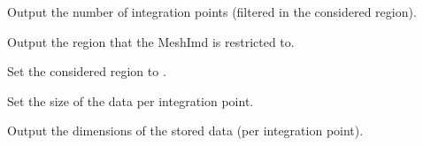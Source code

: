 \documentclass[a4paper,11pt,english]{sphinxmanual}
\begin{document}
\begin{fulllineitems}
\begin{fulllineitems}
\end{fulllineitems}


\begin{fulllineitems}
\label{\detokenize{python/cmdref_MeshImData:getfem.MeshImData.nbpts}}
Output the number of integration points (filtered in the considered region).

\end{fulllineitems}


\begin{fulllineitems}
\label{\detokenize{python/cmdref_MeshImData:getfem.MeshImData.region}}
Output the region that the MeshImd is restricted to.

\end{fulllineitems}


\begin{fulllineitems}
\label{\detokenize{python/cmdref_MeshImData:getfem.MeshImData.set_region}}
Set the considered region to .

\end{fulllineitems}


\begin{fulllineitems}
\label{\detokenize{python/cmdref_MeshImData:getfem.MeshImData.set_tensor_size}}
Set the size of the data per integration point.

\end{fulllineitems}


\begin{fulllineitems}
\label{\detokenize{python/cmdref_MeshImData:getfem.MeshImData.tensor_size}}
Output the dimensions of the stored data (per integration point).

\end{fulllineitems}


\end{fulllineitems}
\end{document}
